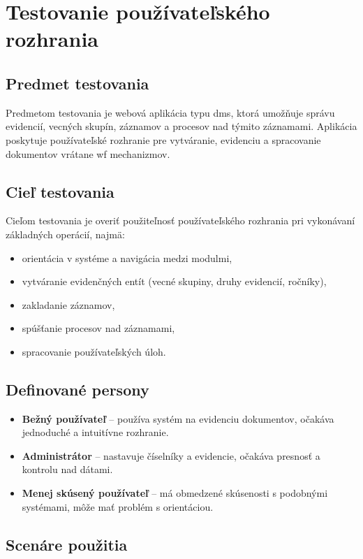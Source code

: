 ﻿\section{Testovanie používateľského rozhrania}

\subsection{Predmet testovania}
Predmetom testovania je webová aplikácia typu \gls{dms}, ktorá umožňuje správu evidencií, vecných skupín, záznamov a procesov nad týmito záznamami. 
Aplikácia poskytuje používateľské rozhranie pre vytváranie, evidenciu a spracovanie dokumentov vrátane \gls{wf} mechanizmov.

\subsection{Cieľ testovania}
Cieľom testovania je overiť použiteľnosť používateľského rozhrania pri vykonávaní základných operácií, najmä:
\begin{itemize}
    \item orientácia v systéme a navigácia medzi modulmi,
    \item vytváranie evidenčných entít (vecné skupiny, druhy evidencií, ročníky),
    \item zakladanie záznamov,
    \item spúšťanie procesov nad záznamami,
    \item spracovanie používateľských úloh.
\end{itemize}

\subsection{Definované persony}
\begin{itemize}
    \item \textbf{Bežný používateľ} – používa systém na evidenciu dokumentov, očakáva jednoduché a intuitívne rozhranie.
    \item \textbf{Administrátor} – nastavuje číselníky a evidencie, očakáva presnosť a kontrolu nad dátami.
    \item \textbf{Menej skúsený používateľ} – má obmedzené skúsenosti s podobnými systémami, môže mať problém s orientáciou.
\end{itemize}

\subsection{Scenáre použitia}

